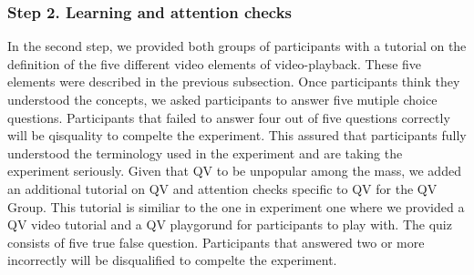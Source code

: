 \subsubsection{Step 2. Learning and attention checks}
In the second step, we provided both groups of participants with a tutorial on the definition of the five different video elements of video-playback. These five elements were described in the previous subsection. Once participants think they understood the concepts, we asked participants to answer five mutiple choice questions. Participants that failed to answer four out of five questions correctly will be qisquality to compelte the experiment. This assured that participants fully understood the terminology used in the experiment and are taking the experiment seriously. Given that QV to be unpopular among the mass, we added an additional tutorial on QV and attention checks specific to QV for the QV Group. This tutorial is similiar to the one in experiment one where we provided a QV video tutorial and a QV playgorund for participants to play with. The quiz consists of five true false question. Participants that answered two or more incorrectly will be disqualified to compelte the experiment.

